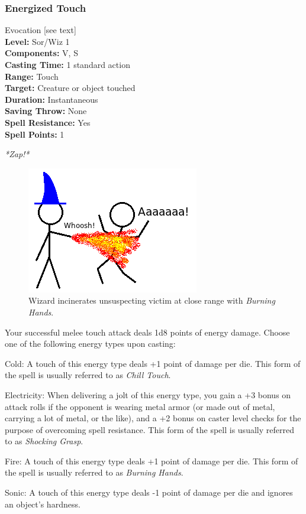 \subsubsection{Energized Touch}
\label{Spell:ShockingGrasp}
Evocation [see text]%
\\ \textbf{Level:} Sor/Wiz 1
\\ \textbf{Components:} V, S
\\ \textbf{Casting Time:} 1 standard action
\\ \textbf{Range:} Touch
\\ \textbf{Target:} Creature or object touched
\\ \textbf{Duration:} Instantaneous
\\ \textbf{Saving Throw:} None
\\ \textbf{Spell Resistance:} Yes
\\ \textbf{Spell Points:} 1

\emph{*Zap!*}

\begin{figure}
  \caption{Wizard incinerates unsuspecting victim at close range with \emph{Burning Hands}.}
  \centering
    \includegraphics{Pics/BurningHands.png}
\end{figure}

Your successful melee touch attack deals 1d8 points of energy damage. Choose one of the following energy types upon casting:
\begin{list}{}{\leftmargin=1em}
 \item Cold: A touch of this energy type deals +1 point of damage per die. This form of the spell is usually referred to as \emph{Chill Touch}.
 \item Electricity: When delivering a jolt of this energy type, you gain a +3 bonus on attack rolls if the opponent is wearing metal armor 
 (or made out of metal, carrying a lot of metal, or the like), 
 and a +2 bonus on caster level checks for the purpose of overcoming spell resistance.
 This form of the spell is usually referred to as \emph{Shocking Grasp}.
 \item Fire: A touch of this energy type deals +1 point of damage per die.
 This form of the spell is usually referred to as \emph{Burning Hands}.
 \item Sonic: A touch of this energy type deals -1 point of damage per die and ignores an object's hardness.
\end{list}

